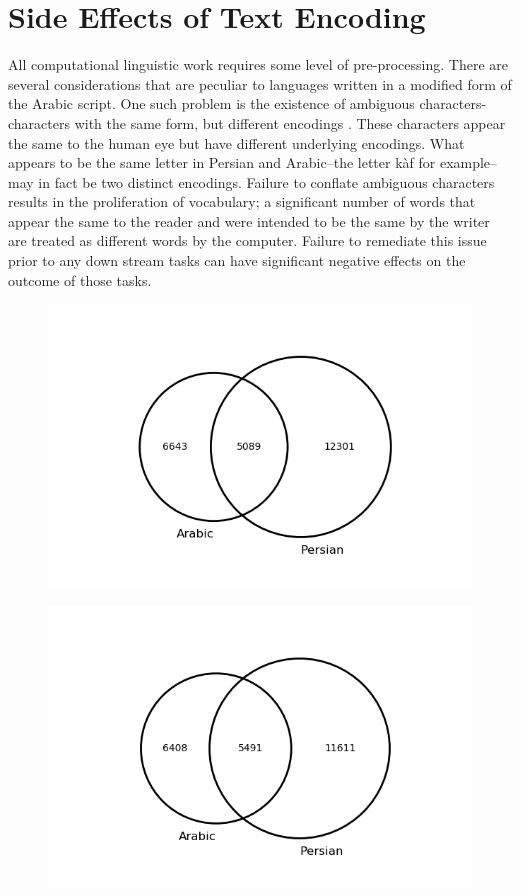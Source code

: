 \documentclass[12pt, oneside]{report}
\begin{document}
\section{Side Effects of Text Encoding}
\par
All computational linguistic work requires some level of pre-processing. There are several considerations that are peculiar to languages written in a modified form of the Arabic script. One such problem is the existence of ambiguous characters-characters with the same form, but different encodings \cite{jaf_semi-automatic_2016}. These characters appear the same to the human eye but have different underlying encodings. What appears to be the same letter in Persian and Arabic–the letter k\`{a}f for example–may in fact be two distinct encodings. Failure to conflate ambiguous characters results in the proliferation of vocabulary; a significant number of words that appear the same to the reader and were intended to be the same by the writer are treated as different words by the computer. Failure to remediate this issue prior to any down stream tasks can have significant negative effects on the outcome of those tasks. \begin{figure}
	\begin{minipage}{\linewidth}
		\centering\captionsetup[subfigure]{justification=centering}
		\includegraphics[width=\linewidth]{figures/venn-proc-one-freq5.png}
		\subcaption{}
		\label{fig:char-norm-a}\par\vfill
		\includegraphics[width=\linewidth]{figures/venn-proc-two-freq5.png}

\end{minipage}
\end{figure}
\end{document}
